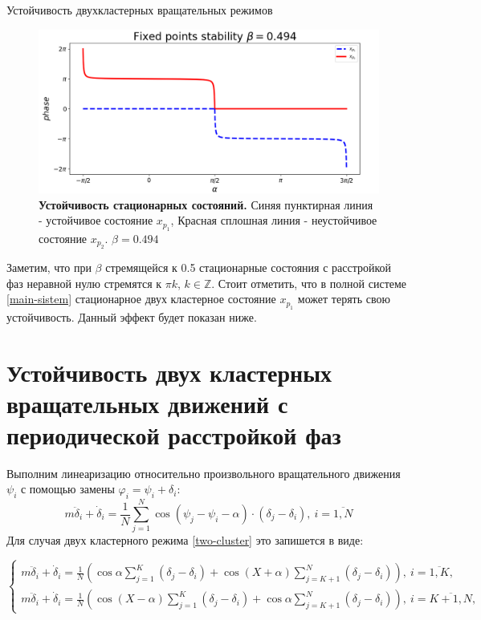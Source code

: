 \begin{chapter}{Устойчивость двухкластерных вращательных режимов}
	\begin{figure}[h!]
		\begin{center}
			\includegraphics[width=1\columnwidth]{pictures/fixed-points-3.png}
		\end{center}
		\caption{\textbf{Устойчивость стационарных состояний.}
		Синяя пунктирная линия - устойчивое состояние $x_{p_1}$,
		Красная сплошная линия - неустойчивое состояние $x_{p_2}$.
		$\beta = 0.494$}
	\end{figure}

	Заметим, что при $\beta$ стремящейся к 0.5 стационарные состояния с расстройкой фаз неравной нулю стремятся
	к $\pi k$, $k \in \mathbb{Z}$.
	Стоит отметить, что в полной системе \ref{main-sistem} стационарное двух кластерное состояние $x_{p_1}$
	может терять свою устойчивость. Данный эффект будет показан ниже.
	
	\section{Устойчивость двух кластерных вращательных движений с периодической расстройкой фаз}

	Выполним линеаризацию относительно произвольного вращательного движения $\psi_i$ с помощью замены
	$\varphi_i = \psi_i + \delta_i$:
	\begin{equation}
		m\ddot{\delta}_i + \dot{\delta}_i = \frac{1}{N} \sum_{j = 1}^N \cos{(\psi_j - \psi_i - \alpha)} \cdot (\delta_j - \delta_i), \ i = \overline{1, N}
	\end{equation}
	Для случая двух кластерного режима \ref{two-cluster} это запишется в виде:
	
	\begin{equation}
		\begin{cases}
			m\ddot{\delta}_i + \dot{\delta}_i = \frac{1}{N} \left( \cos{\alpha} \sum_{j = 1}^K (\delta_j - \delta_i) + \cos{(X + \alpha)} \sum_{j = K + 1}^N (\delta_j - \delta_i) \right), \ i = \overline{1,K}, \\
			m\ddot{\delta}_i + \dot{\delta}_i = \frac{1}{N} \left( \cos{(X - \alpha)} \sum_{j = 1}^K (\delta_j - \delta_i) +  \cos{\alpha} \sum_{j = K + 1}^N (\delta_j - \delta_i)  \right), \ i = \overline{K + 1,N},
		\end{cases}		
	\end{equation}
	

\end{chapter}
